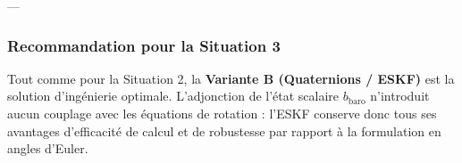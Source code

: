 \documentclass[../Formulations_Kalman.tex]{subfiles}
\begin{document}
---

\subsubsection{Recommandation pour la Situation 3}
Tout comme pour la Situation 2, la \textbf{Variante B (Quaternions / ESKF)} est la solution d'ingénierie optimale. L'adjonction de l'état scalaire $b_{\text{baro}}$ n'introduit aucun couplage avec les équations de rotation : l'ESKF conserve donc tous ses avantages d'efficacité de calcul et de robustesse par rapport à la formulation en angles d'Euler.
\end{document}
